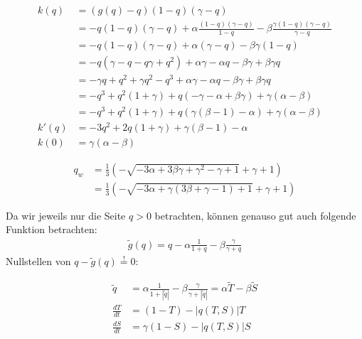 \documentclass[11pt,a4paper]{article}
\begin{document}
	\begin{align*}
		k(q) &= \left( g\left(q\right) - q \right)(1 - q)(\gamma - q) \\
		&= -q(1 - q) (\gamma - q) + \alpha \frac{(1 - q) (\gamma - q)}{1 - q} - \beta \frac{\gamma (1 - q) (\gamma - q)}{\gamma - q} \\
		&= -q(1 - q)(\gamma - q) + \alpha(\gamma - q) - \beta\gamma(1 - q) \\
		&= -q(\gamma - q - q\gamma + q^2) + \alpha\gamma - \alpha q - \beta\gamma + \beta \gamma q \\
		&= -\gamma q + q^2 + \gamma q^2 - q^3 + \alpha\gamma - \alpha q - \beta\gamma + \beta \gamma q \\
		&= -q^3 + q^2(1 + \gamma) + q(-\gamma -\alpha + \beta \gamma) + \gamma(\alpha - \beta) \\
		&= -q^3 + q^2(1 + \gamma) + q(\gamma(\beta - 1) -\alpha) + \gamma(\alpha - \beta) \\
		k'(q) &= -3q^2 + 2q(1+\gamma) + \gamma(\beta - 1) -\alpha \\
		k(0) &=  \gamma(\alpha - \beta)
	\end{align*}		
	
	\begin{align*}
		q_w &= \frac{1}{3} \left( -\sqrt{-3\alpha + 3\beta\gamma + \gamma^2 - \gamma + 1} + \gamma + 1 \right) \\
		&= \frac{1}{3} \left( -\sqrt{-3\alpha + \gamma(3\beta + \gamma - 1) + 1 } + \gamma + 1 \right)
	\end{align*}
	
	Da wir jeweils nur die Seite \(q > 0\) betrachten, können genauso gut auch folgende Funktion betrachten:
	\begin{align*}
		\tilde{g}(q) = q - \alpha \frac{1}{1+q} - \beta \frac{\gamma}{\gamma + q}
	\end{align*}
	Nullstellen von \(q - \tilde{g}(q) \stackrel{!}{=} 0\):
	
	\newpage
	\begin{align*}
		\tilde{q} &= \alpha \frac{1}{1+ |\tilde{q}| } - \beta \frac{\gamma}{\gamma + |\tilde{q}| } = \alpha \tilde{T} - \beta \tilde{S} \\
		\frac{dT}{dt} &= (1 - T) - |q(T,S)|T \\
		\frac{dS}{dt} &= \gamma(1 - S) - |q(T,S)|S \\
	\end{align*}		
	
\end{document}
